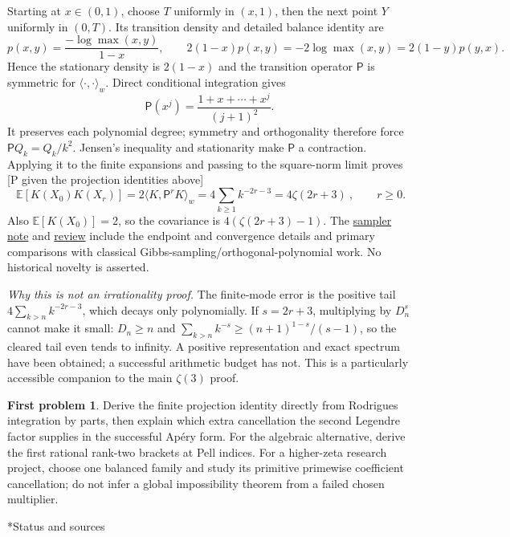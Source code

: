 \documentclass[11pt,a4paper]{article}
\makeatletter
\newcommand{\st}[1]{\textsf{[#1]}}
\newcommand{\codexnote}[2]{\href{https://github.com/BoomydayCoder/Mathathon/blob/03cc75d694220d0fba888c637e573a29799e6d5b/codex/problem131/#1.md}{#2}}
\theoremstyle{definition}
\newtheorem*{problem}{First problem}
\renewcommand\section{\@startsection{section}{1}{\z@}{-2.2ex plus -.6ex minus -.2ex}{1.1ex plus .2ex}{\normalfont\large\bfseries}}
\makeatother
\begin{document}
Starting at $x\in(0,1)$, choose $T$ uniformly in $(x,1)$, then the next point $Y$ uniformly
in $(0,T)$. Its transition density and detailed balance identity are
\[
 p(x,y)=\frac{-\log\max(x,y)}{1-x},\qquad
 2(1-x)p(x,y)=-2\log\max(x,y)=2(1-y)p(y,x).
\]
Hence the stationary density is $2(1-x)$ and the transition operator $\mathsf P$ is symmetric
for $\langle\cdot,\cdot\rangle_w$. Direct conditional integration gives
\[
 \mathsf P(x^j)=\frac{1+x+\cdots+x^j}{(j+1)^2}.
\]
It preserves each polynomial degree; symmetry and orthogonality therefore force
$\mathsf P Q_k=Q_k/k^2$. Jensen's inequality and stationarity make $\mathsf P$ a contraction.
Applying it to the finite expansions and passing to the square-norm limit proves
\st{P given the projection identities above}
\[
 \boxed{\ \mathbb E[K(X_0)K(X_r)]=2\langle K,\mathsf P^rK\rangle_w
       =4\sum_{k\ge1}k^{-2r-3}=4\zeta(2r+3)\ },\qquad r\ge0.
\]
Also $\mathbb E[K(X_0)]=2$, so the covariance is $4(\zeta(2r+3)-1)$.
The \codexnote{uniform-gibbs-zeta-correlations}{sampler note} and
\codexnote{uniform-gibbs-zeta-independent-review}{review} include the endpoint and convergence details
and primary comparisons with classical Gibbs-sampling/orthogonal-polynomial work.
No historical novelty is asserted.

\emph{Why this is not an irrationality proof.} The finite-mode error is the positive tail
$4\sum_{k>n}k^{-2r-3}$, which decays only polynomially. If $s=2r+3$, multiplying by $D_n^s$
cannot make it small: $D_n\ge n$ and
$\sum_{k>n}k^{-s}\ge(n+1)^{1-s}/(s-1)$, so the cleared tail even tends to infinity.
A positive representation and exact spectrum have been obtained; a successful arithmetic budget
has not. This is a particularly accessible companion to the main $\zeta(3)$ proof.

\begin{problem}
Derive the finite projection identity directly from Rodrigues integration by parts, then explain
which extra cancellation the second Legendre factor supplies in the successful Ap\'ery form.
For the algebraic alternative, derive the first rational rank-two brackets at Pell indices.
For a higher-zeta research project, choose one balanced family and study its primitive primewise
coefficient cancellation; do not infer a global impossibility theorem from a failed chosen multiplier.
\end{problem}

\section*{Status and sources}
\begingroup\sloppy
\footnotesize
\end{document}
